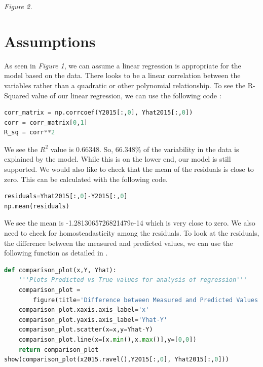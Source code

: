 \documentclass[12pt]{article}
\begin{document}
\begin{center}
    \textit{Figure 2.}
\end{center}

\section*{Assumptions}

\noindent
As seen in \textit{Figure 1}, we can assume a linear regression is appropriate for the model based on the data. There looks to be a linear correlation between the variables rather than a quadratic or other polynomial relationship. To see the R-Squared value of our linear regression, we can use the following code \citep{pythonr2}:
\begin{lstlisting}[language=Python]
corr_matrix = np.corrcoef(Y2015[:,0], Yhat2015[:,0])
corr = corr_matrix[0,1]
R_sq = corr**2
\end{lstlisting}
\noindent
We see the $R^2$ value is 0.66348. So, 66.348\% of the variability in the data is explained by the model. While this is on the lower end, our model is still supported. We would also like to check that the mean of the residuals is close to zero. This can be calculated with the following code.
\begin{lstlisting}[language=Python]
residuals=Yhat2015[:,0]-Y2015[:,0]
np.mean(residuals)
\end{lstlisting}
\noindent
We see the mean is -1.2813065726821479e-14 which is very close to zero. We also need to check for homosteadasticity among the residuals. To look at the residuals, the difference between the measured and predicted values, we can use the following function as detailed in \citet{teitelbaum2021linreg}.
\begin{lstlisting}[language=Python]
def comparison_plot(x,Y, Yhat):
    '''Plots Predicted vs True values for analysis of regression'''
    comparison_plot = 
        figure(title='Difference between Measured and Predicted Values')
    comparison_plot.xaxis.axis_label='x'
    comparison_plot.yaxis.axis_label='Yhat-Y'
    comparison_plot.scatter(x=x,y=Yhat-Y)
    comparison_plot.line(x=[x.min(),x.max()],y=[0,0])
    return comparison_plot
show(comparison_plot(x2015.ravel(),Y2015[:,0], Yhat2015[:,0]))
\end{lstlisting}
\end{document}
